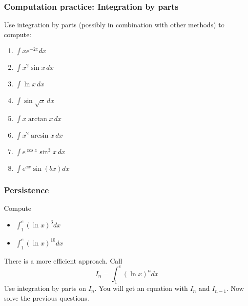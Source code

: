 \documentclass[14pt]{beamer}
\begin{document}
	\begin{frame}[t]
		\frametitle{Computation practice: Integration by parts}

		Use integration by parts (possibly in combination with other methods) to
		compute:
		\begin{multicols}{2}
			\begin{enumerate}
				\item $\displaystyle \int x e^{-2x}dx$
					\vspace{.2cm}

				\item $\displaystyle \int x^{2}\sin x \, dx$
					\vspace{.2cm}

				\item $\displaystyle \int \ln x \, dx$
					\vspace{.2cm}

				\item $\displaystyle \int \sin \sqrt{x}\, dx$
					\vspace{.2cm}

				\item $\displaystyle \int x \arctan x \, dx$
					\vspace{.2cm}

				\item $\displaystyle \int x^{2}\arcsin x \, dx$
					\vspace{.2cm}

				\item $\displaystyle \int e^{\cos x}\sin^{3}x \, dx$
					\vspace{.2cm}

				\item $\displaystyle \int e^{ax}\sin (bx) dx$
					\vspace{.2cm}
			\end{enumerate}
		\end{multicols}
	\end{frame}

	\begin{frame}[t]
		\frametitle{Persistence}
		Compute
		\begin{multicols}{2}
			\begin{itemize}
				\item $\displaystyle \int_{1}^{e}\left( \ln x \right)^{3}dx$
					\vspace{.2cm}

				\item $\displaystyle \int_{1}^{e}\left( \ln x \right)^{10}dx$
			\end{itemize}
		\end{multicols}
		There is a more efficient approach. Call
		\[
			I_{n}= \int_{1}^{e}\left( \ln x \right)^{n}dx
		\]
		Use integration by parts on $I_{n}$. You will get an equation with $I_{n}$ and
		$I_{n-1}$. Now solve the previous questions.

		\vfill
		\hfill \href{https://oeis.org/}{\beamergotobutton{OEIS}}
	\end{frame}
\end{document}
